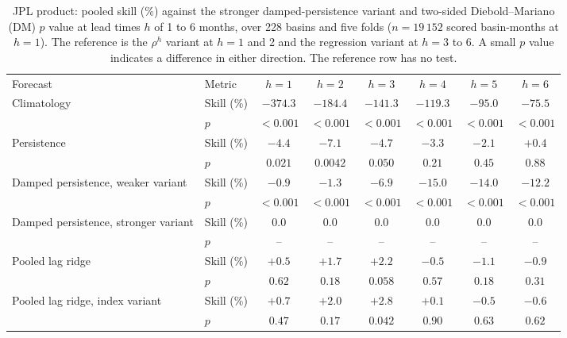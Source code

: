 \documentclass[hess, manuscript]{copernicus}
\begin{document}
\begin{table}[!htbp]
\caption{JPL product: pooled skill (\%) against the stronger
damped-persistence variant and two-sided Diebold--Mariano (DM) $p$ value at
lead times $h$ of 1 to 6 months, over 228 basins and five folds ($n = 19\,152$
scored basin-months at $h = 1$). The reference is the $\rho^{h}$ variant at $h = 1$
and 2 and the regression variant at $h = 3$ to 6. A small $p$ value indicates
a difference in either direction. The
reference row has no test.}
\label{tab:ladderjpl}
\begin{tabular}{@{}llcccccc@{}}
\tophline
Forecast & Metric & $h{=}1$ & $h{=}2$ & $h{=}3$ & $h{=}4$ & $h{=}5$ & $h{=}6$ \\
\middlehline
Climatology & Skill (\%) & $-374.3$ & $-184.4$ & $-141.3$ & $-119.3$ & $-95.0$ & $-75.5$ \\
 & $p$ & $<0.001$ & $<0.001$ & $<0.001$ & $<0.001$ & $<0.001$ & $<0.001$ \\
Persistence & Skill (\%) & $-4.4$ & $-7.1$ & $-4.7$ & $-3.3$ & $-2.1$ & $+0.4$ \\
 & $p$ & $0.021$ & $0.0042$ & $0.050$ & $0.21$ & $0.45$ & $0.88$ \\
Damped persistence, weaker variant & Skill (\%) & $-0.9$ & $-1.3$ & $-6.9$ & $-15.0$ & $-14.0$ & $-12.2$ \\
 & $p$ & $<0.001$ & $<0.001$ & $<0.001$ & $<0.001$ & $<0.001$ & $<0.001$ \\
Damped persistence, stronger variant & Skill (\%) & $0.0$ & $0.0$ & $0.0$ & $0.0$ & $0.0$ & $0.0$ \\
 & $p$ & -- & -- & -- & -- & -- & -- \\
Pooled lag ridge & Skill (\%) & $+0.5$ & $+1.7$ & $+2.2$ & $-0.5$ & $-1.1$ & $-0.9$ \\
 & $p$ & $0.62$ & $0.18$ & $0.058$ & $0.57$ & $0.18$ & $0.31$ \\
Pooled lag ridge, index variant & Skill (\%) & $+0.7$ & $+2.0$ & $+2.8$ & $+0.1$ & $-0.5$ & $-0.6$ \\
 & $p$ & $0.47$ & $0.17$ & $0.042$ & $0.90$ & $0.63$ & $0.62$ \\

\end{tabular}
\end{table}
\end{document}
